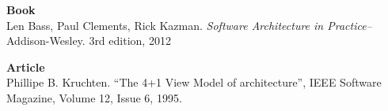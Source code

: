 









\newpage











\begin{thebibliography}{9}
	\textbf{Book} \\
	Len Bass, Paul Clements, Rick Kazman.
	\emph{Software Architecture in Practice–}
	Addison-Wesley.
	3rd edition,
	2012

	\textbf{Article} \\
	Phillipe B. Kruchten.
	“The 4+1 View Model of architecture”, 
	IEEE Software Magazine,
	Volume 12,
	Issue 6, 1995.
	
\end{thebibliography}


